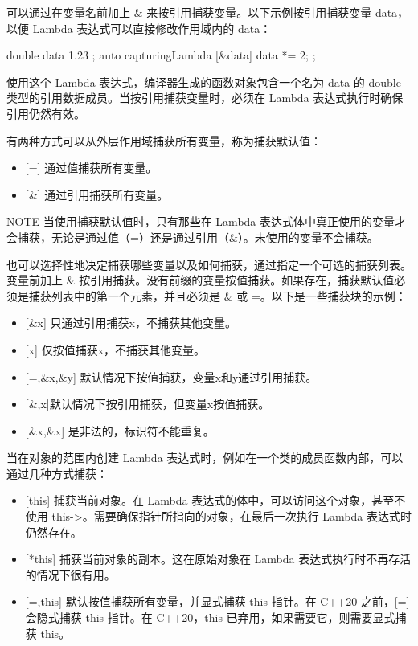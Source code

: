 可以通过在变量名前加上 \& 来按引用捕获变量。以下示例按引用捕获变量 data，以便 Lambda 表达式可以直接修改作用域内的 data：

\begin{cpp}
double data { 1.23 };
auto capturingLambda { [&data]{ data *= 2; } };
\end{cpp}

使用这个 Lambda 表达式，编译器生成的函数对象包含一个名为 data 的 double 类型的引用数据成员。当按引用捕获变量时，必须在 Lambda 表达式执行时确保引用仍然有效。

有两种方式可以从外层作用域捕获所有变量，称为捕获默认值：

\begin{itemize}
\item
{}[=] 通过值捕获所有变量。

\item
{}[\&] 通过引用捕获所有变量。
\end{itemize}

\begin{myNotic}{NOTE}
当使用捕获默认值时，只有那些在 Lambda 表达式体中真正使用的变量才会捕获，无论是通过值（=）还是通过引用（\&）。未使用的变量不会捕获。
\end{myNotic}

也可以选择性地决定捕获哪些变量以及如何捕获，通过指定一个可选的捕获列表。变量前加上 \& 按引用捕获。没有前缀的变量按值捕获。如果存在，捕获默认值必须是捕获列表中的第一个元素，并且必须是 \& 或 =。以下是一些捕获块的示例：

\begin{itemize}
\item
{}[\&x] 只通过引用捕获x，不捕获其他变量。

\item
{}[x] 仅按值捕获x，不捕获其他变量。

\item
{}[=,\&x,\&y] 默认情况下按值捕获，变量x和y通过引用捕获。

\item
{}[\&,x]默认情况下按引用捕获，但变量x按值捕获。

\item
{}[\&x,\&x] 是非法的，标识符不能重复。
\end{itemize}

当在对象的范围内创建 Lambda 表达式时，例如在一个类的成员函数内部，可以通过几种方式捕获：

\begin{itemize}
\item
{}[this] 捕获当前对象。在 Lambda 表达式的体中，可以访问这个对象，甚至不使用 this->。需要确保指针所指向的对象，在最后一次执行 Lambda 表达式时仍然存在。

\item
{}[*this] 捕获当前对象的副本。这在原始对象在 Lambda 表达式执行时不再存活的情况下很有用。

\item
{}[=,this] 默认按值捕获所有变量，并显式捕获 this 指针。在 C++20 之前，[=] 会隐式捕获 this 指针。在 C++20，this 已弃用，如果需要它，则需要显式捕获 this。
\end{itemize}

